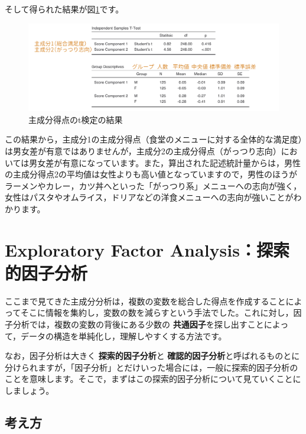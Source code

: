 \documentclass[
  12pt,
  a5jpaper,
  lualatex, ja=standard]{bxjsbook}
\renewcommand{\emph}[1]{\textbf{\color{emph} #1}}
\begin{document}
そして得られた結果が図\ref{fig:factor-pca-ttest-results}です。

\begin{figure}[!ht]

{\centering \includegraphics[width=1\linewidth]{images/factor/pca-ttest-results} 

}

\caption{主成分得点のt検定の結果}\label{fig:factor-pca-ttest-results}
\end{figure}

この結果から，主成分1の主成分得点（食堂のメニューに対する全体的な満足度）は男女差が有意ではありませんが，主成分2の主成分得点（がっつり志向）においては男女差が有意になっています。また，算出された記述統計量からは，男性の主成分得点2の平均値は女性よりも高い値となっていますので，男性のほうがラーメンやカレー，カツ丼へといった「がっつり系」メニューへの志向が強く，女性はパスタやオムライス，ドリアなどの洋食メニューへの志向が強いことがわかります。

\hypertarget{sec:factor-efa}{%
\section{Exploratory Factor Analysis：探索的因子分析}\label{sec:factor-efa}}

ここまで見てきた主成分分析は，複数の変数を総合した得点を作成することによってそこに情報を集約し，変数の数を減らすという手法でした。これに対し，因子分析では，複数の変数の背後にある少数の\emph{共通因子}を探し出すことによって，データの構造を単純化し，理解しやすくする方法です。

なお，因子分析は大きく\emph{探索的因子分析}と\emph{確認的因子分析}と呼ばれるものとに分けられますが，「因子分析」とだけいった場合には，一般に探索的因子分析のことを意味します。そこで，まずはこの探索的因子分析について見ていくことにしましょう。

\hypertarget{sub:factor-efa-basics}{%
\subsection{考え方}\label{sub:factor-efa-basics}}
\end{document}
